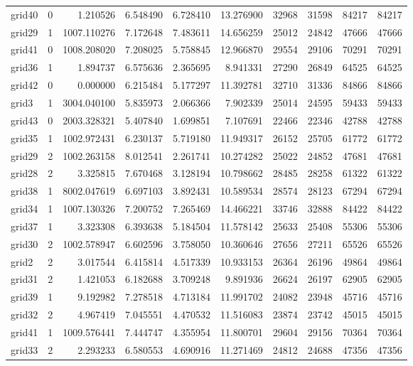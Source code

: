 \begin{longtable}{|l|r|r|r|r|r|r|r|r|r|}
grid40 & 0 & 1.210526 & 6.548490 & 6.728410 & 13.276900 & 32968 & 31598 & 84217 & 84217 \\
grid29 & 1 & 1007.110276 & 7.172648 & 7.483611 & 14.656259 & 25012 & 24842 & 47666 & 47666 \\
grid41 & 0 & 1008.208020 & 7.208025 & 5.758845 & 12.966870 & 29554 & 29106 & 70291 & 70291 \\
grid36 & 1 & 1.894737 & 6.575636 & 2.365695 & 8.941331 & 27290 & 26849 & 64525 & 64525 \\
grid42 & 0 & 0.000000 & 6.215484 & 5.177297 & 11.392781 & 32710 & 31336 & 84866 & 84866 \\
grid3 & 1 & 3004.040100 & 5.835973 & 2.066366 & 7.902339 & 25014 & 24595 & 59433 & 59433 \\
grid43 & 0 & 2003.328321 & 5.407840 & 1.699851 & 7.107691 & 22466 & 22346 & 42788 & 42788 \\
grid35 & 1 & 1002.972431 & 6.230137 & 5.719180 & 11.949317 & 26152 & 25705 & 61772 & 61772 \\
grid29 & 2 & 1002.263158 & 8.012541 & 2.261741 & 10.274282 & 25022 & 24852 & 47681 & 47681 \\
grid28 & 2 & 3.325815 & 7.670468 & 3.128194 & 10.798662 & 28485 & 28258 & 61322 & 61322 \\
grid38 & 1 & 8002.047619 & 6.697103 & 3.892431 & 10.589534 & 28574 & 28123 & 67294 & 67294 \\
grid34 & 1 & 1007.130326 & 7.200752 & 7.265469 & 14.466221 & 33746 & 32888 & 84422 & 84422 \\
grid37 & 1 & 3.323308 & 6.393638 & 5.184504 & 11.578142 & 25633 & 25408 & 55306 & 55306 \\
grid30 & 2 & 1002.578947 & 6.602596 & 3.758050 & 10.360646 & 27656 & 27211 & 65526 & 65526 \\
grid2 & 2 & 3.017544 & 6.415814 & 4.517339 & 10.933153 & 26364 & 26196 & 49864 & 49864 \\
grid31 & 2 & 1.421053 & 6.182688 & 3.709248 & 9.891936 & 26624 & 26197 & 62905 & 62905 \\
grid39 & 1 & 9.192982 & 7.278518 & 4.713184 & 11.991702 & 24082 & 23948 & 45716 & 45716 \\
grid32 & 2 & 4.967419 & 7.045551 & 4.470532 & 11.516083 & 23874 & 23742 & 45015 & 45015 \\
grid41 & 1 & 1009.576441 & 7.444747 & 4.355954 & 11.800701 & 29604 & 29156 & 70364 & 70364 \\
grid33 & 2 & 2.293233 & 6.580553 & 4.690916 & 11.271469 & 24812 & 24688 & 47356 & 47356 \\

\end{longtable}
